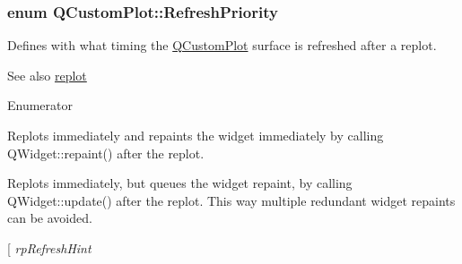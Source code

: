 \subsubsection[{\texorpdfstring{Refresh\+Priority}{RefreshPriority}}]{\setlength{\rightskip}{0pt plus 5cm}enum {\bf Q\+Custom\+Plot\+::\+Refresh\+Priority}}\hypertarget{class_q_custom_plot_a45d61392d13042e712a956d27762aa39}{}\label{class_q_custom_plot_a45d61392d13042e712a956d27762aa39}
Defines with what timing the \hyperlink{class_q_custom_plot}{Q\+Custom\+Plot} surface is refreshed after a replot.

\begin{DoxySeeAlso}{See also}
\hyperlink{class_q_custom_plot_aa4bfe7d70dbe67e81d877819b75ab9af}{replot} 
\end{DoxySeeAlso}
\begin{Desc}
\item[Enumerator]\par
\begin{description}
\item[{\em 
rp\+Immediate\+Refresh\hypertarget{class_q_custom_plot_a45d61392d13042e712a956d27762aa39ae0655eb7caba1996004d27939970af2c}{}\label{class_q_custom_plot_a45d61392d13042e712a956d27762aa39ae0655eb7caba1996004d27939970af2c}
}]Replots immediately and repaints the widget immediately by calling Q\+Widget\+::repaint() after the replot. \item[{\em 
rp\+Queued\+Refresh\hypertarget{class_q_custom_plot_a45d61392d13042e712a956d27762aa39ae51e73bce42e9d76081f2266bb429acb}{}\label{class_q_custom_plot_a45d61392d13042e712a956d27762aa39ae51e73bce42e9d76081f2266bb429acb}
}]Replots immediately, but queues the widget repaint, by calling Q\+Widget\+::update() after the replot. This way multiple redundant widget repaints can be avoided. \item[{\em 
rp\+Refresh\+Hint\hypertarget{class_q_custom_plot_a45d61392d13042e712a956d27762aa39a5349b4ed6366760e34653bc54613a5ad}{}\label{class_q_custom_plot_a45d61392d13042e712a956d27762aa39a5349b4ed6366760e34653bc54613a5ad}
}
\end{description}
\end{Desc}
